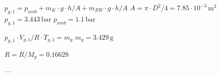 \( p_{g,1} = p_{amb} + m_{K} \cdot g \cdot h / A + m_{EW} \cdot g \cdot h / A \)  
\( A = \pi \cdot D^2 / 4 = 7.85 \cdot 10^{-3} \, \text{m}^2 \)  
\( p_{g,1} = 3.443 \, \text{bar} \)  
\( p_{amb} = 1.1 \, \text{bar} \)  

\( p_{g,1} \cdot V_{g,1} / R \cdot T_{g,1} = m_{g} \)  
\( m_{g} = 3.429 \, \text{g} \)  

\( R = \bar{R} / M_{g} = 0.16628 \)  

---